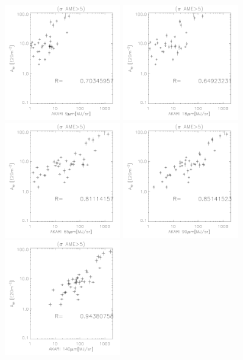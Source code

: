 \begin{figure}[!htb]
\centering
 \includegraphics[width=50mm]{IRIntMWAmp/akari9_Asp_sp.pdf}
  \includegraphics[width=50mm]{IRIntMWAmp/akari18_Asp_sp.pdf}
  \includegraphics[width=50mm]{IRIntMWAmp/akari65_Asp_sp.pdf}
  \includegraphics[width=50mm]{IRIntMWAmp/akari90_Asp_sp.pdf}
  \includegraphics[width=50mm]{IRIntMWAmp/akari140_Asp_sp.pdf}

\end{figure}
